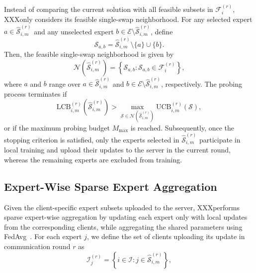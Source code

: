 \documentclass[conference]{IEEEtran}
\newcommand{\xxx}{XXX}%
\begin{document}
Instead of comparing the current solution with all feasible subsets in $\mathcal{F}_i^{(r)}$, \xxx only considers its feasible single-swap neighborhood. For any selected expert $a\in\widehat{\mathcal{S}}_{i,m}^{(r)}$ and any unselected expert $b\in\mathcal{E}\setminus\widehat{\mathcal{S}}_{i,m}^{(r)}$, define
\begin{equation}
\label{eq:single_swap_subset_xxx}
\mathcal{S}_{a,b}
=
\widehat{\mathcal{S}}_{i,m}^{(r)}
\setminus \{a\}
\cup \{b\}.
\end{equation}
Then, the feasible single-swap neighborhood is given by
\begin{equation}
\label{eq:single_swap_neighbor_xxx}
\mathcal{N}
\left(
\widehat{\mathcal{S}}_{i,m}^{(r)}
\right)
=
\left\{
\mathcal{S}_{a,b}
:
\mathcal{S}_{a,b}\in\mathcal{F}_i^{(r)}
\right\},
\end{equation}
where $a$ and $b$ range over
$a\in\widehat{\mathcal{S}}_{i,m}^{(r)}$ and
$b\in\mathcal{E}\setminus\widehat{\mathcal{S}}_{i,m}^{(r)}$, respectively.
The probing process terminates if
\begin{equation}
\label{eq:single_swap_stop_xxx}
\mathrm{LCB}_{i,m}^{(r)}
\left(
\widehat{\mathcal{S}}_{i,m}^{(r)}
\right)
>
\max_{\mathcal{S}\in
\mathcal{N}
\left(
\widehat{\mathcal{S}}_{i,m}^{(r)}
\right)}
\mathrm{UCB}_{i,m}^{(r)}(\mathcal{S}),
\end{equation}
or if the maximum probing budget $M_{\max}$ is reached. Subsequently, once the stopping criterion is satisfied, only the experts selected in $\widehat{\mathcal{S}}_{i,m}^{(r)}$ participate in local training and upload their updates to the server in the current round, whereas the remaining experts are excluded from training.

\subsection{Expert-Wise Sparse Expert Aggregation}
\label{subsec:expert_sparse_aggregation}

Given the client-specific expert subsets uploaded to the server, \xxx performs sparse expert-wise aggregation by updating each expert only with local updates from the corresponding clients, while aggregating the shared parameters using FedAvg~\cite{mcmahan2017communication}. For each expert $j$, we define the set of clients uploading its update in communication round $r$ as
\begin{equation}
\label{eq:client_set_expert}
\mathcal{I}_j^{(r)}
=
\left\{
i\in\mathcal{I}:
j\in
\widehat{\mathcal{S}}_{i,m}^{(r)}
\right\},
\end{equation}
\end{document}
